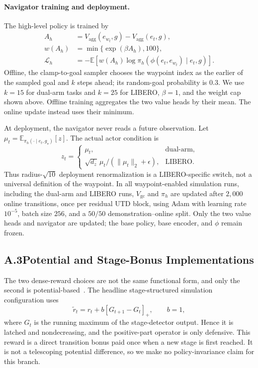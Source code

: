 \documentclass[letterpaper]{article} %
\begin{document}
\paragraph{Navigator training and deployment.}
The high-level policy is trained by
\[
\begin{aligned}
A_h
&=V_{\mathrm{agg}}(e_{w_t},g)-V_{\mathrm{agg}}(e_t,g),\\
w(A_h)
&=\min\{\exp(\beta A_h),100\},\\
\mathcal L_h
&=-\mathbb E\!\left[
 w(A_h)\log\pi_h\!\left(
 \phi(e_t,e_{w_t})\mid e_t,g
 \right)\right].
\end{aligned}
\]
Offline, the clamp-to-goal sampler chooses the waypoint index as the earlier of
the sampled goal and $k$ steps ahead; its random-goal probability is $0.3$.
We use $k=15$ for dual-arm tasks and $k=25$ for LIBERO, $\beta=1$, and the
weight cap shown above. Offline training aggregates the two value heads by
their mean. The online update instead uses their minimum.

At deployment, the navigator never reads a future observation. Let
$\mu_t=\mathbb E_{\pi_h(\cdot\mid e_t,g_\star)}[z]$. The actual actor
condition is
\[
z_t=
\begin{cases}
\mu_t,&\text{dual-arm},\\
\sqrt{d_z}\,\mu_t/(\lVert\mu_t\rVert_2+\epsilon),
&\text{LIBERO}.
\end{cases}
\]
Thus radius-$\sqrt{10}$ deployment renormalization is a LIBERO-specific
switch, not a universal definition of the waypoint. In all waypoint-enabled
simulation runs, including the dual-arm and LIBERO runs, $V_{\mathrm{gc}}$ and
$\pi_h$ are updated after $2{,}000$ online transitions, once per residual UTD
block, using Adam with learning rate $10^{-5}$, batch size $256$, and a $50/50$
demonstration--online split. Only the two value heads and navigator are
updated; the base policy, base encoder, and $\phi$ remain frozen.

\subsection{A.3\quad Potential and Stage-Bonus Implementations}

The two dense-reward choices are not the same functional form, and only the
second is potential-based~\cite{ng1999policy,devlin2012dynamic}. The headline
stage-structured simulation configuration uses
\[
\widetilde r_t=r_t+b[G_{t+1}-G_t]_+,\qquad b=1,
\]
where $G_t$ is the running maximum of the stage-detector output. Hence it is
latched and nondecreasing, and the positive-part operator is only defensive.
This reward is a direct transition bonus paid once when a new stage is first
reached. It is not a telescoping potential difference, so we make no
policy-invariance claim for this branch.
\end{document}
